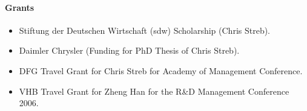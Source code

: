 \paragraph{Grants}
\begin{itemize}
\item Stiftung der Deutschen Wirtschaft (sdw) Scholarship (Chris Streb). 
\item Daimler Chrysler (Funding for PhD Thesis of Chris Streb).
\item DFG Travel Grant for Chris Streb for Academy of Management Conference.
\item VHB Travel Grant for Zheng Han for the R\&D Management Conference 2006.
\end{itemize}